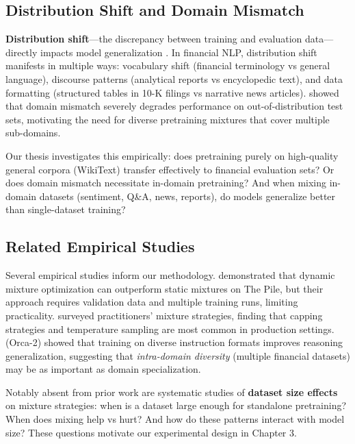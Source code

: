 \subsection{Distribution Shift and Domain Mismatch}

\textbf{Distribution shift}---the discrepancy between training and evaluation data---directly impacts model generalization \parencite{quinonero2009dataset}. In financial NLP, distribution shift manifests in multiple ways: vocabulary shift (financial terminology vs general language), discourse patterns (analytical reports vs encyclopedic text), and data formatting (structured tables in 10-K filings vs narrative news articles). \textcite{aharoni2020unsupervised} showed that domain mismatch severely degrades performance on out-of-distribution test sets, motivating the need for diverse pretraining mixtures that cover multiple sub-domains.

Our thesis investigates this empirically: does pretraining purely on high-quality general corpora (WikiText) transfer effectively to financial evaluation sets? Or does domain mismatch necessitate in-domain pretraining? And when mixing in-domain datasets (sentiment, Q\&A, news, reports), do models generalize better than single-dataset training?

\subsection{Related Empirical Studies}

Several empirical studies inform our methodology. \textcite{xie2023doremi} demonstrated that dynamic mixture optimization can outperform static mixtures on The Pile, but their approach requires validation data and multiple training runs, limiting practicality. \textcite{longpre2023pretrainer} surveyed practitioners' mixture strategies, finding that capping strategies and temperature sampling are most common in production settings. \textcite{mitra2023orca2} (Orca-2) showed that training on diverse instruction formats improves reasoning generalization, suggesting that \textit{intra-domain diversity} (multiple financial datasets) may be as important as domain specialization.

Notably absent from prior work are systematic studies of \textbf{dataset size effects} on mixture strategies: when is a dataset large enough for standalone pretraining? When does mixing help vs hurt? And how do these patterns interact with model size? These questions motivate our experimental design in Chapter 3.
